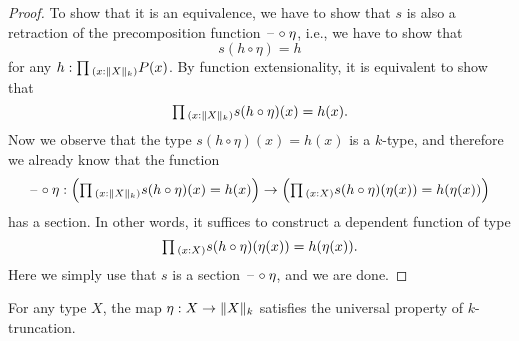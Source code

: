 \begin{proof}
  To show that it is an equivalence, we have to show that $s$ is also a retraction of the precomposition function $\blank\circ\eta$, i.e., we have to show that
  \begin{equation*}
    s(h\circ\eta)= h
  \end{equation*}
  for any $h:\prd{x:\trunc{k}{X}}P(x)$. By function extensionality, it is equivalent to show that
  \begin{equation*}
    \prd{x:\trunc{k}{X}}s(h\circ\eta)(x)=h(x).
  \end{equation*}
  Now we observe that the type $s(h\circ\eta)(x)=h(x)$ is a $k$-type, and therefore we already know that the function
  \begin{equation*}
    \blank\circ\eta:\Big(\prd{x:\trunc{k}{X}}s(h\circ\eta)(x)=h(x)\Big)\to \Big(\prd{x:X}s(h\circ\eta)(\eta(x))=h(\eta(x))\Big)
  \end{equation*}
  has a section. In other words, it suffices to construct a dependent function of type
  \begin{equation*}
    \prd{x:X}s(h\circ\eta)(\eta(x))=h(\eta(x)).
  \end{equation*}
  Here we simply use that $s$ is a section $\blank\circ\eta$, and we are done.
\end{proof}

\begin{cor}\label{cor:k-type-is-reflective-subuniverse}
  For any type $X$, the map $\eta:X\to\trunc{k}{X}$ satisfies the universal property of $k$-truncation. 
\end{cor}

